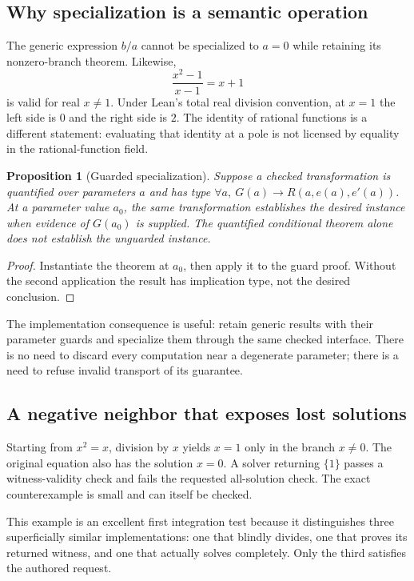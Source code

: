 \documentclass[11pt,letterpaper]{article}
\newtheorem{proposition}{Proposition}[section]
\theoremstyle{definition}
\begin{document}
\subsection{Why specialization is a semantic operation}
The generic expression \(b/a\) cannot be specialized to \(a=0\) while retaining its
nonzero-branch theorem. Likewise,
\[
 \frac{x^2-1}{x-1}=x+1
\]
is valid for real \(x\ne1\). Under Lean's total real division convention, at \(x=1\)
the left side is \(0\) and the right side is \(2\). The identity of rational
functions is a different statement: evaluating that identity at a pole is not
licensed by equality in the rational-function field.

\begin{proposition}[Guarded specialization]
Suppose a checked transformation is quantified over parameters \(a\) and has type
\(\forall a,\ G(a)\to R(a,e(a),e'(a))\). At a parameter value \(a_0\), the same
transformation establishes the desired instance when evidence of \(G(a_0)\) is
supplied. The quantified conditional theorem alone does not establish the
unguarded instance.
\end{proposition}
\begin{proof}
Instantiate the theorem at \(a_0\), then apply it to the guard proof. Without the
second application the result has implication type, not the desired conclusion.
\end{proof}

The implementation consequence is useful: retain generic results with their
parameter guards and specialize them through the same checked interface. There
is no need to discard every computation near a degenerate parameter; there is a
need to refuse invalid transport of its guarantee.

\subsection{A negative neighbor that exposes lost solutions}
Starting from \(x^2=x\), division by \(x\) yields \(x=1\) only in the branch
\(x\ne0\). The original equation also has the solution \(x=0\). A solver returning
\(\{1\}\) passes a witness-validity check and fails the requested all-solution
check. The exact counterexample is small and can itself be checked.

This example is an excellent first integration test because it distinguishes
three superficially similar implementations: one that blindly divides, one that
proves its returned witness, and one that actually solves completely. Only the
third satisfies the authored request.
\end{document}
